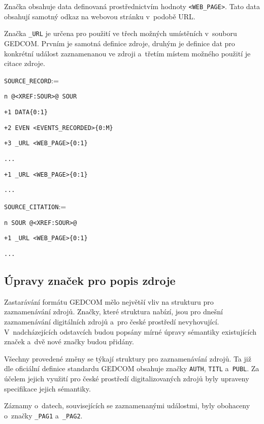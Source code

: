 		Značka obsahuje data definovaná prostřednictvím hodnoty \verb|<WEB_PAGE>|. Tato data obsahují samotný odkaz na webovou stránku v~podobě URL.\par
		Značka \verb|_URL| je určena pro použití ve třech možných umístěních v~souboru GEDCOM. Prvním je samotná definice zdroje, druhým je definice dat pro konkrétní událost zaznamenanou ve zdroji a~třetím místem možného použití je citace zdroje.\par
		\vspace{1em}
		\verb|SOURCE_RECORD|:=\par
		\quad \verb|n @<XREF:SOUR>@ SOUR|\par
		\quad \quad \verb|+1 DATA|\hfill\verb|{0:1}|\par
		\quad \quad \quad \verb|+2 EVEN <EVENTS_RECORDED>|\hfill\verb|{0:M}|\par
		\quad \quad \quad \quad \verb|+3 _URL <WEB_PAGE>|\hfill\verb|{0:1}|\par
		\quad \quad \quad \quad \verb|...|\par
		\quad \quad \verb|+1 _URL <WEB_PAGE>|\hfill\verb|{0:1}|\par
		\quad \quad \verb|...|
		\vspace{1em}
		
		\vspace{1em}
		\verb|SOURCE_CITATION|:=\par
		\quad \verb|n SOUR @<XREF:SOUR>@|\par
		\quad \quad \verb|+1 _URL <WEB_PAGE>|\hfill\verb|{0:1}|\par
		\quad \quad \verb|...|
		\vspace{1em}
			
		\subsection*{Úpravy značek pro popis zdroje}
		Zastarávání formátu GEDCOM mělo největší vliv na strukturu pro zaznamenávání zdrojů. Značky, které struktura nabízí, jsou pro dnešní zaznamenávání digitálních zdrojů a~pro české prostředí nevyhovující. V~nadcházejících odstavcích budou popsány mírné úpravy sémantiky existujících značek a~dvě nové značky budou přidány. \par
		Všechny provedené změny se týkají struktury pro zaznamenávání zdrojů. Ta již dle oficiální definice standardu GEDCOM obsahuje značky \verb|AUTH|, \verb|TITL| a~\verb|PUBL|. Za účelem jejich využití pro české prostředí digitalizovaných zdrojů byly upraveny specifikace jejich sémantiky.\par 
		Záznamy o~datech, souvisejících se zaznamenanými událostmi, byly obohaceny o~značky \verb|_PAG1| a~\verb|_PAG2|. \par
		
